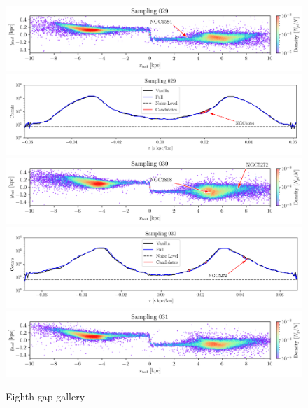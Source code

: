 \documentclass{aa}
\begin{document}
\begin{appendix}
    \begin{figure}
      \centering      
      \includegraphics[width=\linewidth]{gallery_of_gaps_monte-carlo-029.png}    
      \includegraphics[width=\linewidth]{tau-profile-monte-carlo-029.png}  
      \includegraphics[width=\linewidth]{gallery_of_gaps_monte-carlo-030.png}
      \includegraphics[width=\linewidth]{tau-profile-monte-carlo-030.png}
      \includegraphics[width=\linewidth]{gallery_of_gaps_monte-carlo-031.png}
      \caption{Eighth gap gallery}
      \label{fig:gallery7}
      \end{figure}        



\end{appendix}
\end{document}
